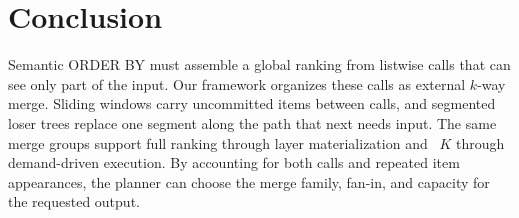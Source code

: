 \section{Conclusion}
\label{sec:conclusion}
Semantic \textsf{ORDER BY} must assemble a global ranking from listwise calls that can see only part of the input. Our framework organizes these calls as external $k$-way merge. Sliding windows carry uncommitted items between calls, and segmented loser trees replace one segment along the path that next needs input. The same merge groups support full ranking through layer materialization and \LIMIT~$K$ through demand-driven execution. By accounting for both calls and repeated item appearances, the planner can choose the merge family, fan-in, and capacity for the requested output.
